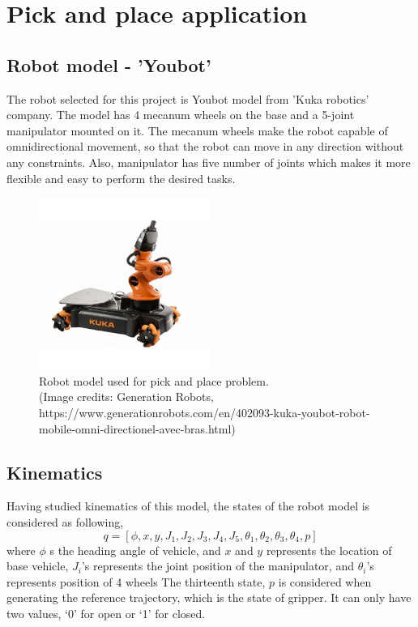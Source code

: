 \documentclass[12pt]{article}
\begin{document}
\section{Pick and place application}
\subsection{Robot model - 'Youbot'}
The robot selected for this project is Youbot model from 'Kuka robotics' company. The model has 4 mecanum wheels on the base and a 5-joint manipulator mounted on it. The mecanum wheels make the robot capable of omnidirectional movement, so that the robot can move in any direction without any constraints. Also, manipulator has five number of joints which makes it more flexible and easy to perform the desired tasks.

\begin{figure}[H]
\centering
\includegraphics[width=0.5\textwidth]{kuka-youbot-robot-mobile-omni-directionel-avec-bras.jpg}
\captionsetup{labelformat=empty}
\caption{Robot model used for pick and place problem.\\ (\footnotesize Image credits: Generation Robots, https://www.generationrobots.com/en/402093-kuka-youbot-robot-mobile-omni-directionel-avec-bras.html)}
\end{figure}

\subsection{Kinematics}
Having studied kinematics of this model, the states of the robot model is considered as following, 
\begin{equation}
    q=[\phi, x, y, J_1, J_2, J_3, J_4, J_5, \theta_1, \theta_2, \theta_3, \theta_4, p]
\end{equation}
where $\phi$ s the heading angle of vehicle, and $x$ and $y$ represents the location of base vehicle,
	             $J_i$'s represents the joint position of  the manipulator, and 
	           $\theta_i$'s represents position of 4 wheels 
The thirteenth state, $p$ is considered when generating the reference trajectory, which is the state of gripper. It can only have two values, ‘0’ for open or ‘1’ for  closed.
\end{document}
